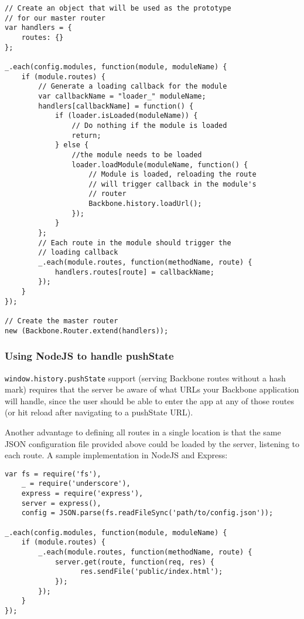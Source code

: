 \documentclass[9pt]{book}
\begin{document}
\begin{verbatim}
// Create an object that will be used as the prototype
// for our master router
var handlers = {
    routes: {}
};

_.each(config.modules, function(module, moduleName) {
    if (module.routes) {
        // Generate a loading callback for the module
        var callbackName = "loader_" moduleName;
        handlers[callbackName] = function() {
            if (loader.isLoaded(moduleName)) {
                // Do nothing if the module is loaded
                return;
            } else {
                //the module needs to be loaded
                loader.loadModule(moduleName, function() {
                    // Module is loaded, reloading the route
                    // will trigger callback in the module's
                    // router
                    Backbone.history.loadUrl();
                });
            }
        };
        // Each route in the module should trigger the
        // loading callback
        _.each(module.routes, function(methodName, route) {
            handlers.routes[route] = callbackName;
        });
    }
});

// Create the master router
new (Backbone.Router.extend(handlers));
\end{verbatim}

\subsubsection{Using NodeJS to handle
pushState}\label{using-nodejs-to-handle-pushstate}

\texttt{window.history.pushState} support (serving Backbone routes
without a hash mark) requires that the server be aware of what URLs your
Backbone application will handle, since the user should be able to enter
the app at any of those routes (or hit reload after navigating to a
pushState URL).

Another advantage to defining all routes in a single location is that
the same JSON configuration file provided above could be loaded by the
server, listening to each route. A sample implementation in NodeJS and
Express:

\begin{verbatim}
var fs = require('fs'),
    _ = require('underscore'),
    express = require('express'),
    server = express(),
    config = JSON.parse(fs.readFileSync('path/to/config.json'));

_.each(config.modules, function(module, moduleName) {
    if (module.routes) {
        _.each(module.routes, function(methodName, route) {
            server.get(route, function(req, res) {
                  res.sendFile('public/index.html');
            });
        });
    }
});
\end{verbatim}
\end{document}
